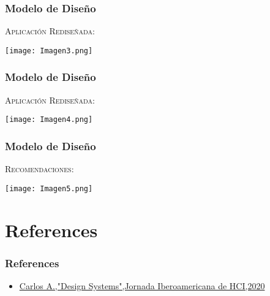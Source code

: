 \documentclass[11pt]{beamer}
\begin{document}
\begin{frame}
\frametitle{Modelo de Diseño}
\begin{itemize}
    \textsc{Aplicación Rediseñada: }
\end{itemize}
\begin{itemize}
\texttt{[image: Imagen3.png]}
\centering
\end{itemize}
\end{frame}

\begin{frame}
\frametitle{Modelo de Diseño}
\begin{itemize}
    \textsc{Aplicación Rediseñada: }
\end{itemize}
\begin{itemize}
\texttt{[image: Imagen4.png]}
\centering
\end{itemize}
\end{frame}

\begin{frame}
\frametitle{Modelo de Diseño}
\begin{itemize}
    \textsc{Recomendaciones: }
\end{itemize}
\begin{itemize}
\texttt{[image: Imagen5.png]}
\centering
\end{itemize}
\end{frame}

\section{References}
\begin{frame}
\frametitle{References}
\begin{itemize}
\item \href{https://www.youtube.com/watch?v=meO8gkOK1pc&feature=youtu.be}{Carlos A.,"Design Systems",Jornada Iberoamericana de HCI,2020}

\end{itemize}
\end{frame}
\end{document}
